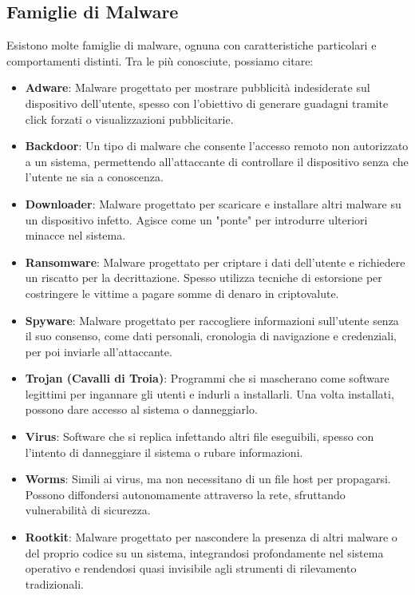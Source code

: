 \subsection{Famiglie di Malware}
Esistono molte famiglie di malware, ognuna con caratteristiche particolari e comportamenti distinti. Tra le più conosciute, possiamo citare:
\begin{itemize}
    \item \textbf{Adware}: Malware progettato per mostrare pubblicità indesiderate sul dispositivo dell'utente, spesso con l'obiettivo di generare guadagni tramite click forzati o visualizzazioni pubblicitarie.
    \item \textbf{Backdoor}: Un tipo di malware che consente l'accesso remoto non autorizzato a un sistema, permettendo all'attaccante di controllare il dispositivo senza che l'utente ne sia a conoscenza.
    \item \textbf{Downloader}: Malware progettato per scaricare e installare altri malware su un dispositivo infetto. Agisce come un "ponte" per introdurre ulteriori minacce nel sistema.
    \item \textbf{Ransomware}: Malware progettato per criptare i dati dell'utente e richiedere un riscatto per la decrittazione. Spesso utilizza tecniche di estorsione per costringere le vittime a pagare somme di denaro in criptovalute.
    \item \textbf{Spyware}: Malware progettato per raccogliere informazioni sull'utente senza il suo consenso, come dati personali, cronologia di navigazione e credenziali, per poi inviarle all'attaccante.
    \item \textbf{Trojan (Cavalli di Troia)}: Programmi che si mascherano come software legittimi per ingannare gli utenti e indurli a installarli. Una volta installati, possono dare accesso al sistema o danneggiarlo.
    \item \textbf{Virus}: Software che si replica infettando altri file eseguibili, spesso con l'intento di danneggiare il sistema o rubare informazioni.
    \item \textbf{Worms}: Simili ai virus, ma non necessitano di un file host per propagarsi. Possono diffondersi autonomamente attraverso la rete, sfruttando vulnerabilità di sicurezza.
    \item \textbf{Rootkit}: Malware progettato per nascondere la presenza di altri malware o del proprio codice su un sistema, integrandosi profondamente nel sistema operativo e rendendosi quasi invisibile agli strumenti di rilevamento tradizionali.

\end{itemize}
